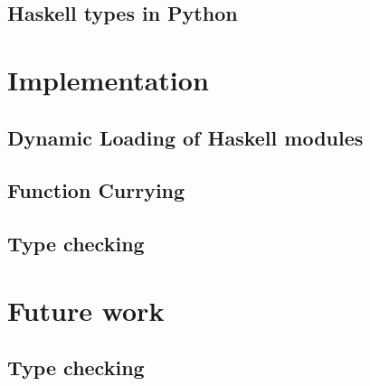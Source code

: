 \documentclass[11pt, letterpaper, oneside, twocolumn] {article}
\begin{document}
\subsection{Haskell types in Python}

\section{Implementation}


\subsection{Dynamic Loading of Haskell modules}


\subsection{Function Currying}


\subsection{Type checking}


\section{Future work}

\subsection{Type checking}

\end{document}
